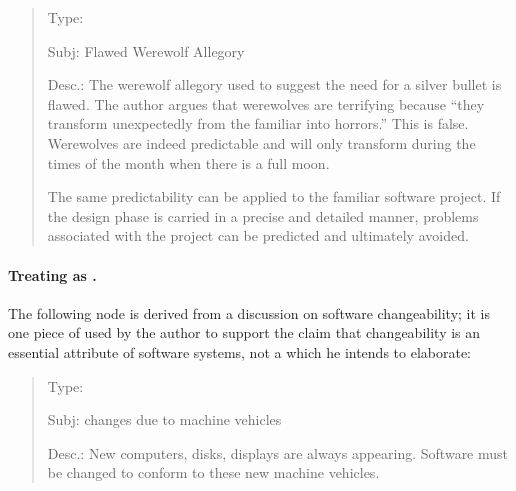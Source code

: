 \small
\begin{quote}
 \begin{itemizenoindent}
   
 \item {\sf Type}: 
 
\item {\sf Subj}: Flawed Werewolf Allegory
 
\item {\sf Desc.}: The werewolf allegory used to suggest the need for a
  silver bullet is flawed.  The author argues that werewolves are
  terrifying because ``they transform unexpectedly from the familiar into
  horrors.''  This is false.  Werewolves are indeed predictable and will
  only transform during the times of the month when there is a full moon.
  
  The same predictability can be applied to the familiar software
  project.  If the design phase is carried in a precise and detailed
  manner, problems associated with the project can be predicted and
  ultimately avoided.
 \end{itemizenoindent}
\end{quote}
\normalsize
{}


\paragraph{Treating  as .}

The following node is derived from a discussion on software changeability;
it is one piece of  used by the author to support the
claim that changeability is an essential attribute of software systems, not
a  which he intends to elaborate:

\small
\begin{quote}
 \begin{itemizenoindent}

\item {\sf Type}: 
 
\item {\sf Subj}: changes due to machine vehicles
 
\item {\sf Desc.}: New computers, disks, displays are always appearing.
  Software must be changed to conform to these new machine vehicles.

\end{itemizenoindent}
\end{quote}
\normalsize
{}


